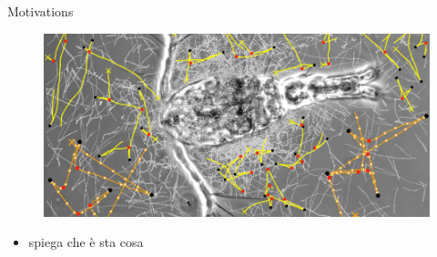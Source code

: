 \documentclass{beamer}
\begin{document}
		\begin{frame}{Motivations}
				\begin{figure}
					\centering
					\includegraphics[scale=0.30]{./images/motivations2.png}
				\end{figure}

				\begin{itemize}
					\item spiega che è sta cosa
				\end{itemize}

	\end{frame}
	
\end{document}
